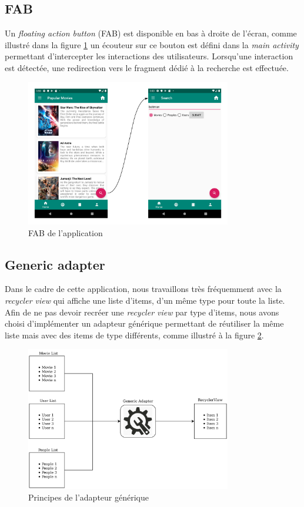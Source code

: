 \subsection{FAB}
Un \textit{floating action button} (FAB) est disponible en bas à droite de l'écran, comme illustré dans la figure \ref{fab} un écouteur sur ce bouton est défini dans la \textit{main activity} permettant d'intercepter les interactions des utilisateurs. Lorsqu'une interaction est détectée, une redirection vers le fragment dédié à la recherche est effectuée.
\begin{figure}
    \begin{center}
        \includegraphics[width=0.8\textwidth]{img/screenshots/FAB.png}
    \end{center}
    \caption{FAB de l'application}
    \label{fab}
\end{figure}

\subsection{Generic adapter}\label{generic-adapter}
Dans le cadre de cette application, nous travaillons très fréquemment avec la \textit{recycler view} qui affiche une liste d'items, d'un même type pour toute la liste. Afin de ne pas devoir recréer une \textit{recycler view} par type d'items, nous avons choisi d'implémenter un adapteur générique permettant de réutiliser la même liste mais avec des items de type différents, comme illustré à la figure \ref{generic_adapter_img}.
\begin{figure}
    \begin{center}
        \includegraphics[width=0.8\textwidth]{img/schemas/Generic_Adapter.png}
    \end{center}
    \caption{Principes de l'adapteur générique}
    \label{generic_adapter_img}
\end{figure}